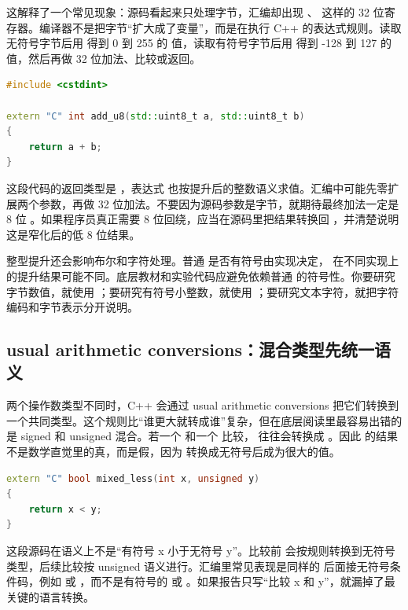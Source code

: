 这解释了一个常见现象：源码看起来只处理字节，汇编却出现 、 这样的 32 位寄存器。编译器不是把字节“扩大成了变量”，而是在执行 C++ 的表达式规则。读取无符号字节后用  得到 0 到 255 的  值，读取有符号字节后用  得到 -128 到 127 的  值，然后再做 32 位加法、比较或返回。

\begin{lstlisting}[language=C++]
#include <cstdint>

extern "C" int add_u8(std::uint8_t a, std::uint8_t b)
{
    return a + b;
}
\end{lstlisting}

这段代码的返回类型是 ，表达式  也按提升后的整数语义求值。汇编中可能先零扩展两个参数，再做 32 位加法。不要因为源码参数是字节，就期待最终加法一定是 8 位 。如果程序员真正需要 8 位回绕，应当在源码里把结果转换回 ，并清楚说明这是窄化后的低 8 位结果。

整型提升还会影响布尔和字符处理。普通  是否有符号由实现决定， 在不同实现上的提升结果可能不同。底层教材和实验代码应避免依赖普通  的符号性。你要研究字节数值，就使用 ；要研究有符号小整数，就使用 ；要研究文本字符，就把字符编码和字节表示分开说明。

\subsection{usual arithmetic conversions：混合类型先统一语义}

两个操作数类型不同时，C++ 会通过 usual arithmetic conversions 把它们转换到一个共同类型。这个规则比“谁更大就转成谁”复杂，但在底层阅读里最容易出错的是 signed 和 unsigned 混合。若一个  和一个  比较， 往往会转换成 。因此  的结果不是数学直觉里的真，而是假，因为  转换成无符号后成为很大的值。

\begin{lstlisting}[language=C++]
extern "C" bool mixed_less(int x, unsigned y)
{
    return x < y;
}
\end{lstlisting}

这段源码在语义上不是“有符号 x 小于无符号 y”。比较前  会按规则转换到无符号类型，后续比较按 unsigned 语义进行。汇编里常见表现是同样的  后面接无符号条件码，例如  或 ，而不是有符号的  或 。如果报告只写“比较 x 和 y”，就漏掉了最关键的语言转换。

